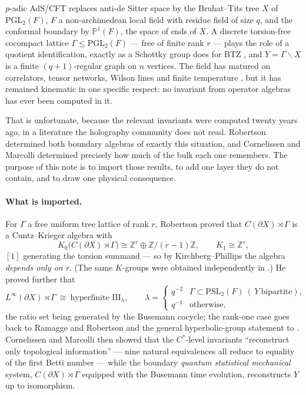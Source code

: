 \documentclass[11pt]{article}
\theoremstyle{plain}
\theoremstyle{remark}
\newcommand{\Z}{\mathbb{Z}}
\newcommand{\PP}{\mathbb{P}}
\newcommand{\III}{\mathrm{III}}
\begin{document}
$p$-adic AdS/CFT \cite{GKPSW,HMSS} replaces anti-de Sitter space by the Bruhat--Tits tree
$X$ of $\mathrm{PGL}_2(F)$, $F$ a non-archimedean local field with residue field of size
$q$, and the conformal boundary by $\PP^1(F)$, the space of ends of $X$. A discrete
torsion-free cocompact lattice $\Gamma\le\mathrm{PGL}_2(F)$ --- free of finite rank $r$ ---
plays the role of a quotient identification, exactly as a Schottky group does for BTZ
\cite{HuangJepsen}, and $Y=\Gamma\backslash X$ is a finite $(q{+}1)$-regular graph on $n$
vertices. The field has matured on correlators, tensor networks, Wilson lines and finite
temperature \cite{GubserParikh,Marcolli20,HuangJepsen,Mondal}, but it has remained
kinematic in one specific respect: no invariant from operator algebras has ever been
computed in it.

That is unfortunate, because the relevant invariants were computed twenty years ago, in a
literature the holography community does not read. Robertson \cite{Rob05} determined both
boundary algebras of exactly this situation, and Cornelissen and Marcolli \cite{CM13}
determined precisely how much of the bulk each one remembers. The purpose of this note is
to import those results, to add one layer they do not contain, and to draw one physical
consequence.

\paragraph{What is imported.}
For $\Gamma$ a free uniform tree lattice of rank $r$, Robertson proved
\cite[Thm.~1]{Rob05} that $C(\partial X)\rtimes\Gamma$ is a Cuntz--Krieger algebra with
\begin{equation}\label{eq:K}
K_0\bigl(C(\partial X)\rtimes\Gamma\bigr)\cong\Z^{r}\oplus\Z/(r-1)\Z,
\qquad K_1\cong\Z^{r},
\end{equation}
$[1]$ generating the torsion summand --- so by Kirchberg--Phillips the algebra
\emph{depends only on $r$}. (The same $K$-groups were obtained independently in
\cite{CLM08}.) He proved further \cite[Thm.~2, Cor.~1]{Rob05} that
\begin{equation}\label{eq:type}
L^\infty(\partial X)\rtimes\Gamma\ \cong\ \text{hyperfinite }\III_\lambda,\qquad
\lambda=\begin{cases}q^{-2}&\Gamma\subset\mathrm{PSL}_2(F)\ (\,Y\ \text{bipartite}),\\
q^{-1}&\text{otherwise},\end{cases}
\end{equation}
the ratio set being generated by the Busemann cocycle; the rank-one case goes back to
Ramagge and Robertson \cite{RR97} and the general hyperbolic-group statement to
\cite{INO08,Bowen14}. Cornelissen and Marcolli \cite{CM13} then showed that the
$C^*$-level invariants ``reconstruct only topological information'' --- nine natural
equivalences all reduce to equality of the first Betti number --- while the boundary
\emph{quantum statistical mechanical} system, $C(\partial X)\rtimes\Gamma$ equipped with
the Busemann time evolution, reconstructs $Y$ up to isomorphism.
\end{document}
